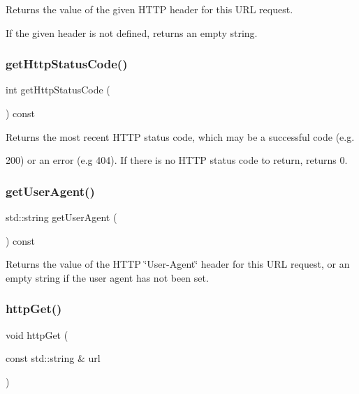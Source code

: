 Returns the value of the given H\+T\+TP header for this U\+RL request. 

If the given header is not defined, returns an empty string. \mbox{\label{classGDownloader_ab6c069ef77f1319830dcfd90eed6a2ce}} 
\subsubsection{\texorpdfstring{get\+Http\+Status\+Code()}{getHttpStatusCode()}}
{\footnotesize\ttfamily int get\+Http\+Status\+Code (\begin{DoxyParamCaption}{ }\end{DoxyParamCaption}) const}



Returns the most recent H\+T\+TP status code, which may be a successful code (e.\+g. 

200) or an error (e.\+g 404). If there is no H\+T\+TP status code to return, returns 0. \mbox{\label{classGDownloader_a479f109234aad1c792be804bf6320c62}} 
\subsubsection{\texorpdfstring{get\+User\+Agent()}{getUserAgent()}}
{\footnotesize\ttfamily std\+::string get\+User\+Agent (\begin{DoxyParamCaption}{ }\end{DoxyParamCaption}) const}



Returns the value of the H\+T\+TP \char`\"{}\+User-\/\+Agent\char`\"{} header for this U\+RL request, or an empty string if the user agent has not been set. 

\mbox{\label{classGDownloader_a4bafb98a98bc6edc2403a3734c985618}} 
\subsubsection{\texorpdfstring{http\+Get()}{httpGet()}}
{\footnotesize\ttfamily void http\+Get (\begin{DoxyParamCaption}\item[{const std\+::string \&}]{url }\end{DoxyParamCaption})}




